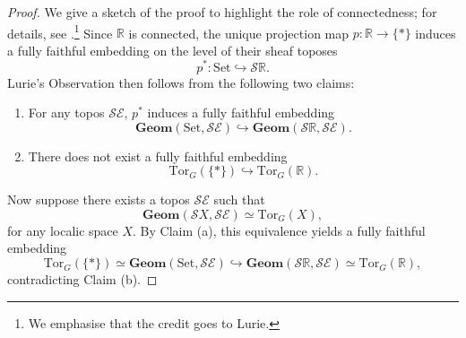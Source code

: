 \documentclass[a4paper, 11pt,reqno]{amsart}
\newcommand{\Tor}{\mathrm{Tor}}
\newcommand{\Set}{\mathrm{Set}}
\newcommand{\R}{\mathbb{R}}
\newcommand{\baseS}{\mathcal{S}}
\newcommand{\E}{\mathcal{E}}
\newcommand{\BG}{\mathrm{BG}}
\begin{document}
\begin{proof} We give a sketch of the proof to highlight the role of connectedness; for details, see \cite[Observation 6.5.5]{NgThesis}.\footnote{We emphasise that the credit goes to Lurie.} Since $\R$ is connected, the unique projection map $p\colon \R\to\{*\}$ induces a fully faithful embedding on the level of their sheaf toposes
	\begin{equation*}
	p^*\colon \Set\hookrightarrow  \baseS\R.
	\end{equation*}
 Lurie's Observation then follows from the following two claims:
 \begin{enumerate}[label=(\alph*)]
 	\item For any topos $\baseS\E$, $p^*$ induces a fully faithful embedding 
 	\begin{equation*}\label{eq:p*inducedmap}
 	\textbf{Geom}(\Set,\baseS\E)\hookrightarrow \textbf{Geom}(\baseS\R,\baseS\E).
 	\end{equation*}	
 	\item There does not exist a fully faithful embedding 
 	\begin{equation*}
 	\Tor_G(\{*\})\hookrightarrow \Tor_{G}(\R).
 	\end{equation*}
 \end{enumerate}
Now suppose there exists a topos $\baseS\E$ such that 
	\[\textbf{Geom}(\baseS X,\baseS\E)\simeq \Tor_{G}(X),\]
	for any localic space $X$. By Claim (a), this equivalence yields a fully faithful embedding
	\[ \Tor_G(\{*\})\simeq \textbf{Geom}(\Set,\baseS\E)\hookrightarrow \textbf{Geom}(\baseS\R,\baseS\E) \simeq \Tor_G(\R),\]
	contradicting Claim (b).
\end{proof}



\end{document}

